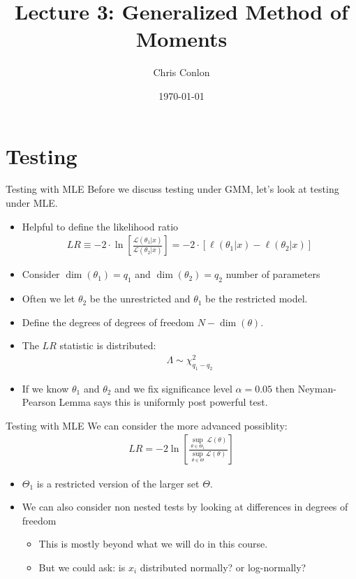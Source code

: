 \documentclass[aspectratio=169]{beamer}
\title{Lecture 3: Generalized Method of Moments}
\author{Chris Conlon }
\institute{NYU Stern }
\date{\today}
\begin{document}
\maketitle



\section{Testing}

\begin{frame}{Testing with MLE}
Before we discuss testing under GMM, let's look at testing under MLE.
\begin{itemize}
\item Helpful to define the \alert{likelihood ratio}
\begin{align*}
LR \equiv -2 \cdot \ln \left[ \frac{\mathcal{L}(\theta_1 | x)}{\mathcal{L}(\theta_2 | x)}  \right]= -2 \cdot \left[ \ell(\theta_1 | x) - \ell(\theta_2 | x) \right]
\end{align*}
\item Consider $\dim(\theta_1) = q_1$ and $\dim(\theta_2) = q_2$ \alert{number of parameters}
\item Often we let $\theta_2$ be the \alert{unrestricted} and $\theta_1$ be the \alert{restricted} model.
\item Define the degrees of \alert{degrees of freedom} $N - \dim(\theta)$.
\item The $LR$ statistic is distributed:
\begin{align*}
 \Lambda \sim \chi^2_{q_1-q_2}
\end{align*}
\item If we know $\theta_1$ and $\theta_2$ and we fix significance level $\alpha =0.05$ then \alert{Neyman-Pearson Lemma} says this is \alert{uniformly post powerful test}.
\end{itemize}
\end{frame}

\begin{frame}{Testing with MLE}
We can consider the more advanced possiblity:
\begin{align*}
L R=-2 \ln \left[\frac{\sup _{\theta \in \Theta_{1}} \mathcal{L}(\theta)}{\sup _{\theta \in \Theta} \mathcal{L}(\theta)}\right]
\end{align*}
\begin{itemize}
\item $\Theta_1$ is a restricted version of the larger set $\Theta$.
\item We can also consider \alert{non nested tests} by looking at differences in \alert{degrees of freedom}
\begin{itemize}
\item This is mostly beyond what we will do in this course.
\item But we could ask: is $x_i$ distributed normally? or log-normally?
\end{itemize}
\end{itemize}
\end{frame}
\end{document}
